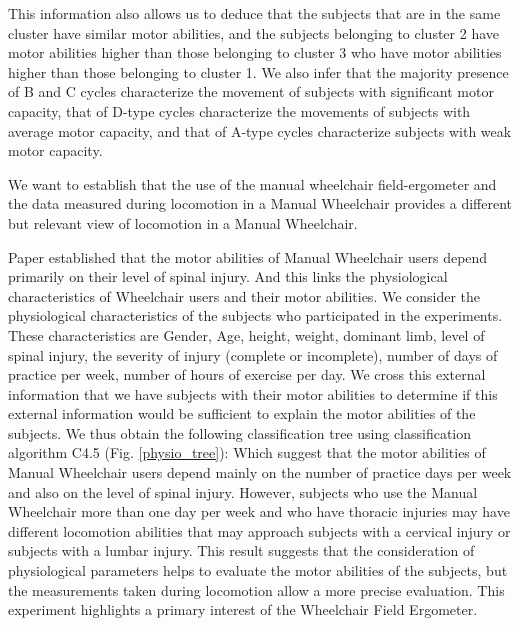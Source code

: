 This information also allows us to deduce that the subjects that are in the same cluster have similar motor abilities, and the subjects belonging to cluster 2 have motor abilities higher than those belonging to cluster 3 who have motor abilities higher than those belonging to cluster 1. We also infer that the majority presence of B and C cycles characterize the movement of subjects with significant motor capacity, that of D-type cycles characterize the movements of subjects with average motor capacity, and that of A-type cycles characterize subjects with weak motor capacity.


We want to establish that the use of the manual wheelchair field-ergometer and the data measured during locomotion in a Manual Wheelchair provides a different but relevant view of locomotion in a Manual Wheelchair. 


Paper \cite{athanasiou2009bayesian} established that the motor abilities of Manual Wheelchair users depend primarily on their level of spinal injury. And this links the physiological characteristics of Wheelchair users and their motor abilities. We consider the physiological characteristics of the subjects who participated in the experiments. These characteristics are Gender, Age, height, weight, dominant limb, level of spinal injury, the severity of injury (complete or incomplete), number of days of practice per week, number of hours of exercise per day. We cross this external information that we have subjects with their motor abilities to determine if this external information would be sufficient to explain the motor abilities of the subjects. We thus obtain the following classification tree using classification algorithm C4.5 (Fig. \ref{physio_tree}): Which suggest that the motor abilities of Manual Wheelchair users depend mainly on the number of practice days per week and also on the level of spinal injury. However, subjects who use the Manual Wheelchair more than one day per week and who have thoracic injuries may have different locomotion abilities that may approach subjects with a cervical injury or subjects with a lumbar injury. This result suggests that the consideration of physiological parameters helps to evaluate the motor abilities of the subjects, but the measurements taken during locomotion allow a more precise evaluation. This experiment highlights a primary interest of the Wheelchair Field Ergometer.

